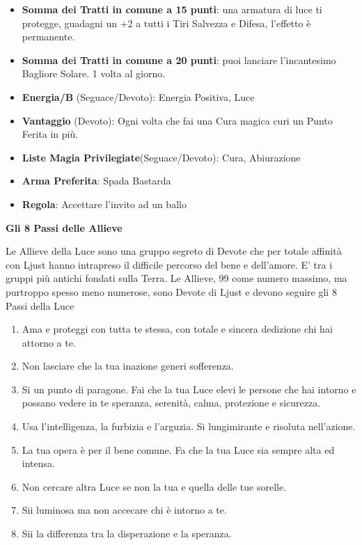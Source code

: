 \begin{multicols}{2}
\begin{itemize}[leftmargin=*]
\item \textbf{Somma dei Tratti in comune a 15 punti}: una armatura di luce ti protegge, guadagni un +2 a tutti i Tiri Salvezza e Difesa, l'effetto è permanente.
\item \textbf{Somma dei Tratti in comune a 20 punti}: puoi lanciare l'incantesimo Bagliore Solare. 1 volta al giorno.
\item \textbf{Energia/B} (Seguace/Devoto): Energia Positiva, Luce
\item \textbf{Vantaggio} (Devoto): Ogni volta che fai una Cura magica curi un Punto Ferita in più.
\item \textbf{Liste Magia Privilegiate}(Seguace/Devoto): Cura, Abiurazione
\item \textbf{Arma Preferita}: Spada Bastarda
\item \textbf{Regola}: Accettare l'invito ad un ballo
\end{itemize}

\medskip

\textbf{Gli 8 Passi delle Allieve}

\medskip

Le Allieve della Luce sono una gruppo segreto di Devote che per totale affinità con Ljust hanno intrapreso il difficile percorso del bene e dell'amore. E' tra i gruppi più antichi fondati sulla Terra. Le Allieve, 99 come numero massimo, ma purtroppo spesso meno numerose, sono Devote di Ljust e devono seguire gli 8 Passi della Luce

\begin{enumerate}[leftmargin=*] \setlength{\itemsep}{0pt}
\item Ama e proteggi con tutta te stessa, con totale e sincera dedizione chi hai attorno a te.
\item Non lasciare che la tua inazione generi sofferenza.
\item Si un punto di paragone. Fai che la tua Luce elevi le persone che hai intorno e possano vedere in te speranza, serenità, calma, protezione e sicurezza.
\item Usa l'intelligenza, la furbizia e l'arguzia. Si lungimirante e risoluta nell'azione.
\item La tua opera è per il bene comune. Fa che la tua Luce sia sempre alta ed intensa.
\item Non cercare altra Luce se non la tua e quella delle tue sorelle.
\item Sii luminosa ma non accecare chi è intorno a te.
\item Sii la differenza tra la disperazione e la speranza.
\end{enumerate}


\end{multicols}
